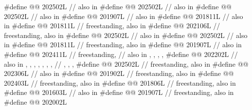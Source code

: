 \begin{codeblock}
#define @@                   202502L // also in 
#define @@                     202502L // also in 
#define @@                   202502L // also in 
#define @@                  201907L // also in 
#define @@             201811L // also in 
#define @@                   201811L // freestanding, also in 
#define @@                202106L // freestanding, also in 
#define @@           202502L // also in 
#define @@           202502L // also in 
#define @@                 201811L // freestanding, also in 
#define @@                  201907L // also in 
#define @@              202411L // freestanding,
  // also in , , , , 
#define @@                 202202L
  // also in , , , , , , ,
  // , , , 
#define @@                         202502L // freestanding, also in 
#define @@                 202306L // also in 
#define @@                         201902L // freestanding, also in 
#define @@                         202403L // freestanding, also in 
#define @@                 201806L // freestanding, also in 
#define @@           201603L // also in 
#define @@                            201907L // freestanding, also in 
#define @@                          202002L

\end{codeblock}
